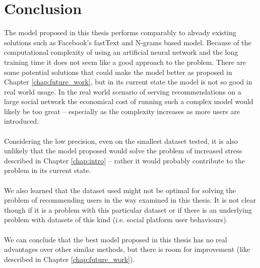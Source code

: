 \chapter{Conclusion}\label{chap:conclusion}
The model proposed in this thesis performs comparably to already existing solutions such as Facebook's fastText and N-grams based model. Because of the computational complexity of using an artificial neural network and the long training time it does not seem like a good approach to the problem. There are some potential solutions that could make the model better as proposed in Chapter \ref{chap:future_work}, but in its current state the model is not so good in real world usage. In the real world scenario of serving recommendations on a large social network the economical cost of running such a complex model would likely be too great -- especially as the complexity increases as more users are introduced.
\\\\
Considering the low precision, even on the smallest dataset tested, it is also unlikely that the model proposed would solve the problem of increased stress described in Chapter \ref{chap:intro} -- rather it would probably contribute to the problem in its current state.
\\\\
We also learned that the dataset used might not be optimal for solving the problem of recommending users in the way examined in this thesis. It is not clear though if it is a problem with this particular dataset or if there is an underlying problem with datasets of this kind (i.e. social platform user behaviours).
\\\\
We can conclude that the best model proposed in this thesis has no real advantages over other similar methods, but there is room for improvement (like described in Chapter \ref{chap:future_work}).